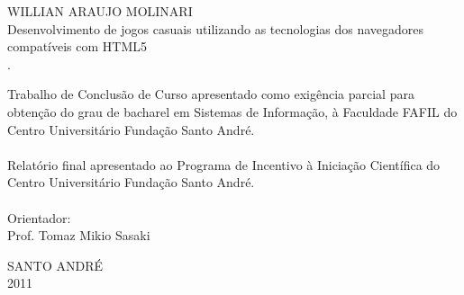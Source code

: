 \thispagestyle{empty}

\vspace{3cm}
\begin{center}
\large WILLIAN ARAUJO MOLINARI \\
\vspace{5.5cm}
\LARGE Desenvolvimento de jogos casuais utilizando as tecnologias dos navegadores compatíveis com HTML5 \\
\vspace{0.5cm}
\normalsize.\\
\hspace{6cm} \begin{minipage}{0.5\textwidth}
Trabalho de Conclusão de Curso apresentado como exigência parcial para
obtenção do grau de bacharel em Sistemas de Informação, à Faculdade
FAFIL do Centro Universitário Fundação Santo André. \\
\\
Relatório final apresentado ao Programa de Incentivo à Iniciação
Científica do Centro Universitário Fundação Santo André.\\
\\
Orientador: \\
Prof. Tomaz Mikio Sasaki
\end{minipage}
\vspace{5.5cm}

\large SANTO ANDRÉ \\ 2011
\end{center}
